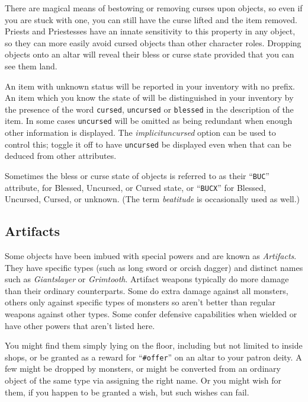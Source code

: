 \documentclass[titlepage]{article}
\begin{document}
There are magical means of bestowing or removing curses upon objects,
so even if you are stuck with one, you can still have the curse
lifted and the item removed.
Priests and Priestesses have an innate
sensitivity to this property in any object, so they can more easily avoid
cursed objects than other character roles.
Dropping objects onto an altar will reveal their bless or curse state
provided that you can see them land.

An item with unknown status will be reported in your inventory with no prefix.
An item which you know the state of will be distinguished in your inventory
by the presence of the word \texttt{cursed}, \texttt{uncursed} or
\texttt{blessed} in the description of the item.
In some cases \texttt{uncursed} will be omitted as being redundant when
enough other information is displayed.
The
\textit{implicit\textunderscore uncursed}
option can be used to control this; toggle it off to have \texttt{uncursed}
be displayed even when that can be deduced from other attributes.

Sometimes the bless or curse state of objects is referred to as their
``\texttt{BUC}'' attribute, for Blessed, Uncursed, or Cursed state,
or ``\texttt{BUCX}'' for Blessed, Uncursed, Cursed, or unknown.
(The term \textit{beatitude} is occasionally used as well.)

\subsection*{Artifacts}

Some objects have been imbued with special powers and are known as
\textit{Artifacts}.
They have specific types (such as long sword or orcish dagger) and distinct
names such as \textit{Giantslayer} or \textit{Grimtooth}.
Artifact weapons typically do more damage than their ordinary counterparts.
Some do extra damage against all monsters, others only against specific
types of monsters so aren't better than regular weapons against other types.
Some confer defensive capabilities when wielded or have other powers that
aren't listed here.

You might find them simply lying on the floor, including but not limited
to inside shops, or be granted as a reward for ``\texttt{\#offer}'' on an
altar to your patron deity.
A few might be dropped by monsters, or might be converted from an ordinary
object of the same type via assigning the right name.
Or you might wish for them, if you happen to be granted a wish, but such
wishes can fail.
\end{document}
